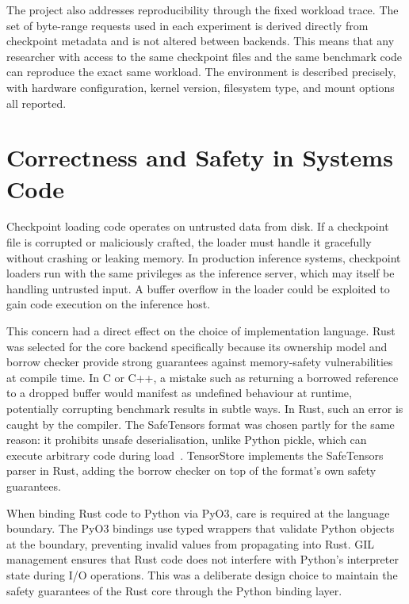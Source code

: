 The project also addresses reproducibility through the fixed workload trace. The set of byte-range requests used in each experiment is derived directly from checkpoint metadata and is not altered between backends. This means that any researcher with access to the same checkpoint files and the same benchmark code can reproduce the exact same workload. The environment is described precisely, with hardware configuration, kernel version, filesystem type, and mount options all reported.

\section{Correctness and Safety in Systems Code}

Checkpoint loading code operates on untrusted data from disk. If a checkpoint file is corrupted or maliciously crafted, the loader must handle it gracefully without crashing or leaking memory. In production inference systems, checkpoint loaders run with the same privileges as the inference server, which may itself be handling untrusted input. A buffer overflow in the loader could be exploited to gain code execution on the inference host.

This concern had a direct effect on the choice of implementation language. Rust was selected for the core backend specifically because its ownership model and borrow checker provide strong guarantees against memory-safety vulnerabilities at compile time. In C or C++, a mistake such as returning a borrowed reference to a dropped buffer would manifest as undefined behaviour at runtime, potentially corrupting benchmark results in subtle ways. In Rust, such an error is caught by the compiler. The SafeTensors format was chosen partly for the same reason: it prohibits unsafe deserialisation, unlike Python pickle, which can execute arbitrary code during load~\cite{safetensors_docs}. TensorStore implements the SafeTensors parser in Rust, adding the borrow checker on top of the format's own safety guarantees.

When binding Rust code to Python via PyO3, care is required at the language boundary. The PyO3 bindings use typed wrappers that validate Python objects at the boundary, preventing invalid values from propagating into Rust. GIL management ensures that Rust code does not interfere with Python's interpreter state during I/O operations. This was a deliberate design choice to maintain the safety guarantees of the Rust core through the Python binding layer.

